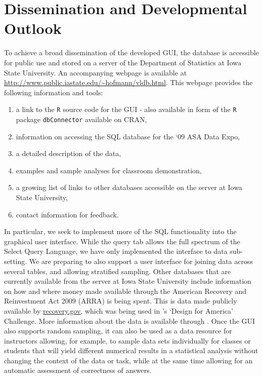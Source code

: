 \documentclass[11pt]{tise_style}
\newcommand{\red}[1]{{\color{red} #1}}
\begin{document}

\section{{Dissemination and Developmental Outlook}}
To achieve a broad dissemination of the developed GUI, the database is accessible for public use and stored on a server of the Department of Statistics at Iowa State University. An accompanying webpage is available at \url{http://www.public.iastate.edu/~hofmann/vldb.html}.
This webpage provides the following information and tools: 
\begin{enumerate} 
\item a link to the {\tt R} source code for the GUI - also available in form of the {\tt R} package {\tt dbConnector} available on CRAN, 
\item information on accessing the SQL database for the `09 ASA Data Expo, 
\item a detailed description of the data,  
\item examples and sample analyses for classroom demonstration, 
\item a growing list of links to other databases accessible on the server at Iowa State University, 
\item contact information for feedback.
\end{enumerate}
In particular, we seek to implement more of the SQL functionality into the graphical user interface. While the query tab allows the full spectrum of the Select Query Language, we have only implemented the interface to data sub-setting. We are preparing to also support a user interface for joining data across several tables, and allowing stratified sampling. 
Other databases that are currently available from the server at Iowa State University include information on how and where money made available through the American Recovery and Reinvestment Act 2009 (ARRA) is being spent. This is data made publicly available by \url{recovery.gov}, which was being used in \citet{designforamerica}'s `Design for America' Challenge. More information about the data is available through \citet{arra}.
Once the GUI also supports random sampling, it can also be used as a data resource for instructors allowing, for example, to sample data sets individually for classes or students that will yield different numerical results in a statistical analysis without changing the context of the data or task, while at the same time allowing for an automatic assessment of correctness of answers.    
\end{document}
